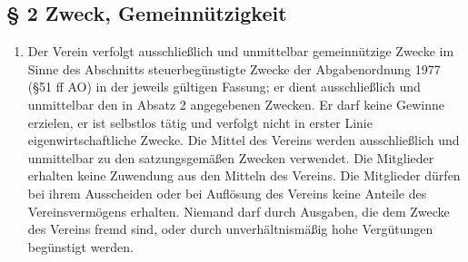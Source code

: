 \documentclass[10pt,a4paper]{scrartcl}
\newcommand{\qs}[1]{\glqq#1\grqq}
\begin{document}
\subsection*{§ 2 Zweck, Gemeinnützigkeit}
\begin{enumerate}
\item Der Verein verfolgt ausschließlich und unmittelbar gemeinnützige
Zwecke im Sinne des Abschnitts \qs{steuerbegünstigte Zwecke} der
Abgabenordnung 1977 (§51 ff AO) in der jeweils gültigen Fassung;
er dient ausschließlich und unmittelbar den in Absatz 2 angegebenen
Zwecken. Er darf keine Gewinne erzielen, er ist selbstlos
tätig und verfolgt nicht in erster Linie eigenwirtschaftliche Zwecke.
Die Mittel des Vereins werden ausschließlich und unmittelbar zu den
satzungsgemäßen Zwecken verwendet. Die Mitglieder erhalten keine
Zuwendung aus den Mitteln des Vereins. Die Mitglieder dürfen bei
ihrem Ausscheiden oder bei Auflösung des Vereins keine Anteile des
Vereinsvermögens erhalten. Niemand darf durch Ausgaben, die dem
Zwecke des Vereins fremd sind, oder durch unverhältnismäßig hohe
Vergütungen begünstigt werden.


\end{enumerate}
\end{document}
